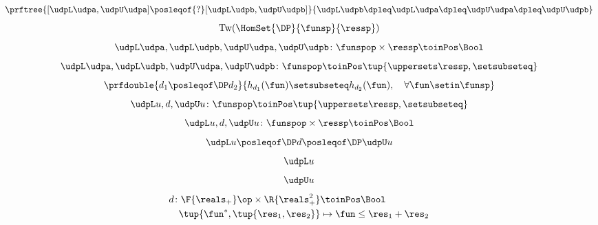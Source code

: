 {\begin{forslides}
    \begin{equation}
        \label{eq:order_udp_1}
        \prftree{[\udpL\udpa,\udpU\udpa] \posleqof{?} [\udpL\udpb,\udpU\udpb]}{\udpL\udpb\dpleq\udpL\udpa\dpleq\udpU\udpa\dpleq\udpU\udpb}
    \end{equation}
    \begin{equation}
        \label{eq:order_udp_2}
        \text{Tw}(\HomSet{\DP}{\funsp}{\ressp})
    \end{equation}
    \begin{equation}
        \label{eq:order_udp_3}
        \udpL\udpa,\udpL\udpb,\udpU\udpa,\udpU\udpb\colon \funspop \times \ressp \toinPos \Bool
    \end{equation}
    \begin{equation}
        \label{eq:order_udp_4}
        \udpL\udpa,\udpL\udpb,\udpU\udpa,\udpU\udpb\colon \funspop \toinPos  \tup{\uppersets \ressp, \setsubseteq}
    \end{equation}
    \begin{equation}
        \label{eq:upos_dp_def_4}
        \prfdouble{
            d_1\posleqof\DP d_2
        }{
            h_{d_1}(\fun)\setsubseteq h_{d_2}(\fun), \quad \forall \fun \setin \funsp
        }
    \end{equation}
    \begin{equation}
        \label{eq:order_udp_5}
        \udpL u,d,\udpU u\colon \funspop \toinPos  \tup{\uppersets \ressp, \setsubseteq}
    \end{equation}
    \begin{equation}
        \label{eq:order_udp_6}
        \udpL u,d,\udpU u\colon  \funspop \times \ressp \toinPos \Bool
    \end{equation}
    \begin{equation}
        \label{eq:order_udp_7}
        \udpL u \posleqof\DP d \posleqof\DP \udpU u
    \end{equation}
    \begin{equation}
        \label{eq:order_udp_8}
        \udpL u
    \end{equation}
    \begin{equation}
        \label{eq:order_udp_9}
        \udpU u
    \end{equation}
    \begin{equation}
        \label{eq:order_udp_10}
        \begin{aligned}
            d\colon \F{\reals_+}\op \times \R{\reals_+^2} & \toinPos \Bool \\
            \tup{\fun^*, \tup{\res_1,\res_2}}             & \mapsto \fun \leq \res_1+\res_2

\end{aligned}
\end{equation}
\end{forslides}}
